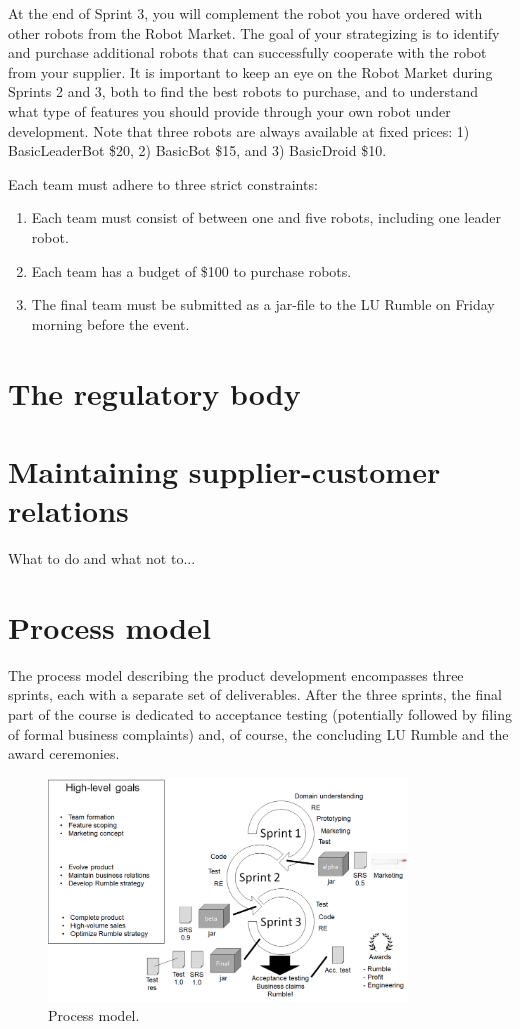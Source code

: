 \documentclass{scrreprt}
\begin{document}
At the end of Sprint 3, you will complement the robot you have ordered with other robots from the Robot Market. The goal of your strategizing is to identify and purchase additional robots that can successfully cooperate with the robot from your supplier. It is important to keep an eye on the Robot Market during Sprints 2 and 3, both to find the best robots to purchase, and to understand what type of features you should provide through your own robot under development. Note that three robots are always available at fixed prices: 1) BasicLeaderBot \$20, 2) BasicBot \$15, and 3) BasicDroid \$10.

Each team must adhere to three strict constraints: 

\begin{enumerate}
\item Each team must consist of between one and five robots, including one leader robot.
\item Each team has a budget of \$100 to purchase robots.
\item The final team must be submitted as a jar-file to the LU Rumble on Friday morning before the event. 
\end{enumerate}

\chapter{The regulatory body} \label{sec:regbody}

\chapter{Maintaining supplier-customer relations}
What to do and what not to...

\chapter{Process model} \label{sec:process}
The process model describing the product development encompasses three sprints, each with a separate set of deliverables. 
After the three sprints, the final part of the course is dedicated to acceptance testing (potentially followed by filing of formal business complaints) and, of course, the concluding LU Rumble and the award ceremonies. 

\begin{figure}
\centering
\includegraphics[width=0.85\textwidth]{figures/processModel.png}
\caption{Process model.}
\label{fig:overview}
\end{figure}
\end{document}

